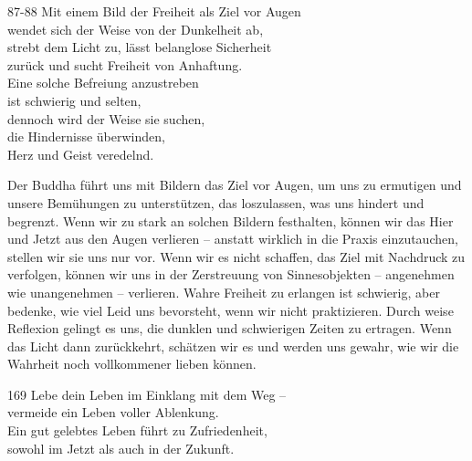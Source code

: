 
\begin{dhpVerse}{87-88}
\label{dhp-87}\label{dhp-88}
Mit einem Bild der Freiheit als Ziel vor Augen\\ 
wendet sich der Weise von der Dunkelheit ab, \\ 
strebt dem Licht zu, lässt belanglose Sicherheit\\ 
zurück und sucht Freiheit von Anhaftung.\\ 
Eine solche Befreiung anzustreben\\ 
ist schwierig und selten,\\ 
dennoch wird der Weise sie suchen,\\ 
die Hindernisse überwinden,\\ 
Herz und Geist veredelnd. 
\end{dhpVerse}

\begin{dhpRefl}

Der Buddha führt uns mit Bildern das Ziel vor Augen, um uns zu ermutigen und
unsere Bemühungen zu unterstützen, das loszulassen, was uns hindert und
begrenzt. Wenn wir zu stark an solchen Bildern festhalten, können wir das Hier
und Jetzt aus den Augen verlieren -- anstatt wirklich in die Praxis
einzutauchen, stellen wir sie uns nur vor. Wenn wir es nicht schaffen, das
Ziel mit Nachdruck zu verfolgen, können wir uns in der Zerstreuung von
Sinnesobjekten -- angenehmen wie unangenehmen -- verlieren. Wahre Freiheit zu
erlangen ist schwierig, aber bedenke, wie viel Leid uns bevorsteht, wenn wir
nicht praktizieren. Durch weise Reflexion gelingt es uns, die dunklen und
schwierigen Zeiten zu ertragen. Wenn das Licht dann zurückkehrt, schätzen wir
es und werden uns gewahr, wie wir die Wahrheit noch vollkommener lieben
können.

\end{dhpRefl}


\begin{dhpVerse}{169}
\label{dhp-169}
Lebe dein Leben im Einklang mit dem Weg --\\ 
vermeide ein Leben voller Ablenkung.\\ 
Ein gut gelebtes Leben führt zu Zufriedenheit,\\ 
sowohl im Jetzt als auch in der Zukunft. 
\end{dhpVerse}

